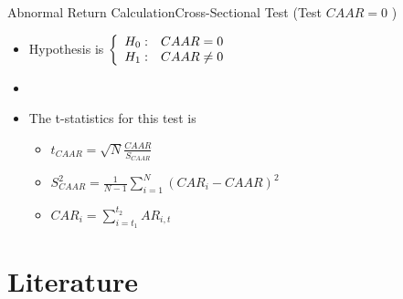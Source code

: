 \documentclass{beamer}
\begin{document}
\begin{frame}{Abnormal Return Calculation}{Cross-Sectional Test (Test $ CAAR=0 $ )}
     
 \begin{itemize}
\item Hypothesis is  $\left\{\begin{array}{c c }
H_0: & CAAR=0\\
H_1: & CAAR\neq 0
\end{array}\right.
$\\
\item[]
\item The t-statistics for this test is 
\begin{itemize}
\item 
$
t_{CAAR} = \sqrt{N}\frac{CAAR}{S_{CAAR}}
$
\item 
$
S^2_{CAAR} = \frac{1}{N-1}\sum_{i = 1}^{N}(CAR_i - {CAAR})^2
$
\item
\scriptsize
 $ CAR_i = \sum_{i=t_1}^{t_2} AR_{i,t} $ 
\normalsize 
\end{itemize}
\end{itemize}

\end{frame}



\section{Literature}
\end{document}
